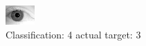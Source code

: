 \begin{figure}[h!]
\begin{center}
\includegraphics[width=0.60\columnwidth]{figures/ID2106_class_4_target_3.png}
\end{center}
\caption{ Classification: 4 actual target: 3}
\label{fig:ID2106_class_4_target_3}
\end{figure}
